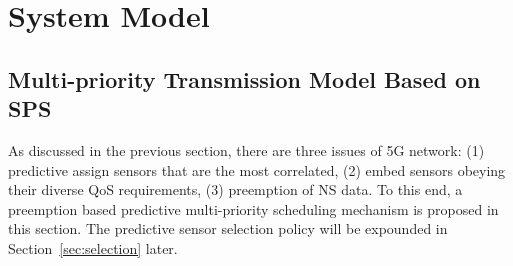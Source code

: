 \documentclass{SCIS2021}
\begin{document}

	
	\section{System Model}
	\label{model}
	
	\subsection{Multi-priority Transmission Model Based on SPS}       
	\label{sssec:preemption} 
	{\color{black}As discussed in the previous section, there are three issues of 5G network: (1) predictive assign sensors that are the most correlated, (2) embed sensors obeying their diverse QoS requirements, (3) preemption of NS data. To this end, a preemption based predictive multi-priority scheduling mechanism is proposed in this section. The predictive sensor selection policy will be expounded in Section~\ref{sec:selection} later.}
	
\end{document}
